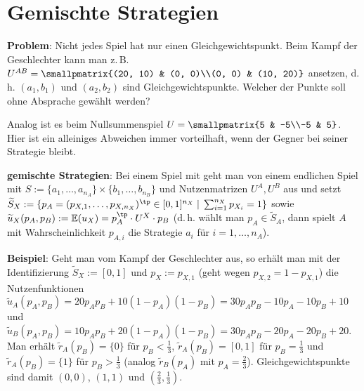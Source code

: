 \section{%
    Gemischte Strategien%
}

\textbf{Problem}:
Nicht jedes Spiel hat nur einen Gleichgewichtspunkt.
Beim Kampf der Geschlechter kann man z.\,B.
$U^{AB} = \smallpmatrix{(20, 10) & (0, 0)\\(0, 0) & (10, 20)}$ ansetzen,
d.\,h. $(a_1, b_1)$ und $(a_2, b_2)$ sind Gleichgewichtspunkte.
Welcher der Punkte soll ohne Absprache gewählt werden?

Analog ist es beim Nullsummenspiel $U = \smallpmatrix{5 & -5\\-5 & 5}$.
Hier ist ein alleiniges Abweichen immer vorteilhaft, wenn der Gegner bei seiner Strategie bleibt.

\linie

\textbf{gemischte Strategien}:
Bei einem Spiel mit  geht man von einem endlichen Spiel mit
$S := \{a_1, \dotsc, a_{n_A}\} \times \{b_1, \dotsc, b_{n_B}\}$ und Nutzenmatrizen $U^A, U^B$
aus und setzt\\
$\widetilde{S}_X := \{p_A = (p_{X,1}, \dotsc, p_{X,n_X})^\tp \in [0, 1]^{n_X} \;|\;
\sum_{i=1}^{n_X} p_{X_i} = 1\}$ sowie\\
$\widetilde{u}_X(p_A, p_B) := \EE(u_X) = p_A^\tp \cdot U^X \cdot p_B$
(d.\,h. wählt man $p_A \in \widetilde{S}_A$, dann spielt $A$ mit Wahrscheinlichkeit $p_{A,i}$
die Strategie $a_i$ für $i = 1, \dotsc, n_A$).

\textbf{Beispiel}:
Geht man vom Kampf der Geschlechter aus, so erhält man mit der Identifizierung
$\widetilde{S}_X := [0, 1]$ und $p_X := p_{X,1}$ (geht wegen $p_{X,2} = 1 - p_{X,1}$)
die Nutzenfunktionen\\
$\widetilde{u}_A(p_A, p_B) = 20 p_A p_B + 10 (1 - p_A) (1 - p_B)
= 30 p_A p_B - 10 p_A - 10 p_B + 10$ und\\
$\widetilde{u}_B(p_A, p_B) = 10 p_A p_B + 20 (1 - p_A) (1 - p_B)
= 30 p_A p_B - 20 p_A - 20 p_B + 20$.\\
Man erhält
$\widetilde{r}_A(p_B) = \{0\}$ für $p_B < \frac{1}{3}$,
$\widetilde{r}_A(p_B) = [0, 1]$ für $p_B = \frac{1}{3}$ und
$\widetilde{r}_A(p_B) = \{1\}$ für $p_B > \frac{1}{3}$
(analog $\widetilde{r}_B(p_A)$ mit $p_A = \frac{2}{3}$).
Gleichgewichtspunkte sind damit $(0, 0)$, $(1, 1)$ und $(\frac{2}{3}, \frac{1}{3})$.

\pagebreak
